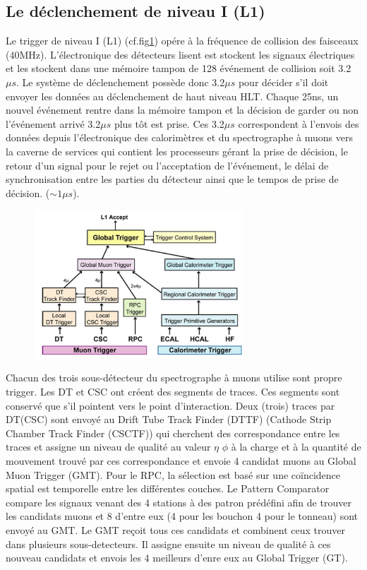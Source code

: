 \subsection{Le déclenchement de niveau I (L1)}
Le trigger de niveau I (L1) (cf.fig\cref*{L1}) opére à la fréquence de collision des faisceaux (40MHz). L'électronique des détecteurs lisent est stockent les  signaux électriques et les stockent dans une mémoire tampon de 128 événement de collision soit 3.2$\mu s$. Le système de déclenchement possède donc 3.2$\mu s$ pour  décider s'il doit envoyer les données au déclenchement de haut niveau HLT. Chaque 25ns, un nouvel événement rentre dans la mémoire tampon et la décision de garder ou non l'événement arrivé 3.2$\mu s$ plus tôt est prise. Ces 3.2$\mu s$ correspondent à l'envois des données depuis l'électronique des calorimètres et du spectrographe à muons vers la caverne de services qui contient les processeurs gérant la prise de décision, le retour d'un signal pour le rejet ou l'acceptation de l'événement, le délai de synchronisation entre les parties du détecteur ainsi que le tempos de prise de décision. ($\sim1\mu s$). 

	  \begin{figure}[ht!]
	\centering
	\includegraphics[width=0.70\textwidth]{CMS/L1.png}
	\label{L1}
\end{figure}

Chacun des trois sous-détecteur du spectrographe à muons utilise sont propre trigger. Les DT et CSC ont créent des segments de traces. Ces segments sont conservé que s'il pointent vers le point d'interaction. Deux (trois) traces par DT(CSC) sont envoyé au Drift Tube Track Finder (DTTF) (Cathode Strip Chamber Track Finder (CSCTF)) qui cherchent des correspondance entre les traces et assigne un niveau de qualité  au valeur $\eta$ $\phi$ à la charge et à la quantité de mouvement trouvé par ces correspondance et envoie 4 candidat muons au Global Muon Trigger (GMT). Pour le RPC, la sélection est basé sur une coïncidence spatial est temporelle entre les différentes couches. Le Pattern Comparator compare les signaux venant des 4 stations à des patron prédéfini afin de trouver les candidats muons et 8 d'entre eux (4 pour les bouchon 4 pour le tonneau) sont envoyé au GMT. Le GMT reçoit tous ces candidats et combinent ceux trouver dans plusieurs sous-detecteurs. Il assigne ensuite un niveau de qualité à ces nouveau candidats et envois les 4 meilleurs d'enre eux au Global Trigger (GT).

